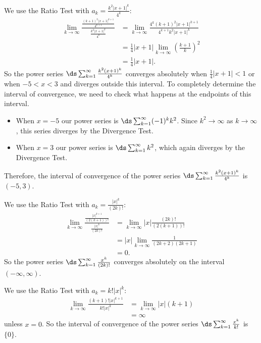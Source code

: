 \begin{activitySolution}
    \item We use the Ratio Test with $a_k = \frac{k^2|x+1|^k}{4^k}$:
    \begin{align*}
    \lim_{k \to \infty} \frac{ \frac{(k+1)^2|x+1|^{k+1}}{4^{k+1}} }{ \frac{k^2|x+1|^k}{4^k} } &= \lim_{k \to \infty} \frac{4^k(k+1)^2|x+1|^{k+1}}{4^{k+1}k^2|x+1|^k} \\
        &= \frac{1}{4}|x+1| \lim_{k \to \infty} \left(\frac{k+1}{k}\right)^2 \\
        &= \frac{1}{4}|x+1|.
    \end{align*}
    So the power series $\ds \sum_{k=1}^{\infty} \frac{k^2(x+1)^k}{4^k}$ converges absolutely when $\frac{1}{4}|x+1| < 1$ or when $-5 < x < 3$ and diverges outside this interval. To completely determine the interval of convergence, we need to check what happens at the endpoints of this interval.
    \begin{itemize}
    \item When $x=-5$ our power series is $\ds \sum_{k=1}^{\infty} (-1)^k k^2$. Since $k^2 \to \infty$ as $k \to \infty$, this series diverges by the Divergence Test.
    \item When $x=3$ our power series is $\ds \sum_{k=1}^{\infty} k^2$, which again diverges by the Divergence Test. 
    \end{itemize}
    Therefore, the interval of convergence of the power series $\ds \sum_{k=1}^{\infty} \frac{k^2(x+1)^k}{4^k}$ is $(-5,3)$.

    \item We use the Ratio Test with $a_k = \frac{|x|^k}{(2k)!}$:
    \begin{align*}
    \lim_{k \to \infty} \frac{ \frac{|x|^{k+1}}{(2(k+1))!} }{ \frac{|x|^k}{(2k)!} } &= \lim_{k \to \infty} |x|\frac{(2k)!}{(2(k+1))!} \\
        &= |x| \lim_{k \to \infty} \frac{1}{(2k+2)(2k+1)} \\
        &= 0.
    \end{align*}
    So the power series $\ds \sum_{k=1}^{\infty} \frac{x^k}{(2k)!}$ converges absolutely on the interval $(-\infty, \infty)$.  
    
    
    \item We use the Ratio Test with $a_k = k!|x|^k$:
    \begin{align*}
    \lim_{k \to \infty} \frac{ (k+1)!|x|^{k+1} }{ k!|x|^k} &= \lim_{k \to \infty} |x|(k+1) \\
        &= \infty
    \end{align*}
    unless $x=0$. So the interval of convergence of the power series $\ds \sum_{k=1}^{\infty} \frac{x^k}{k!}$ is $\{0\}$.
    

\ea
\end{activitySolution}
\aftera 